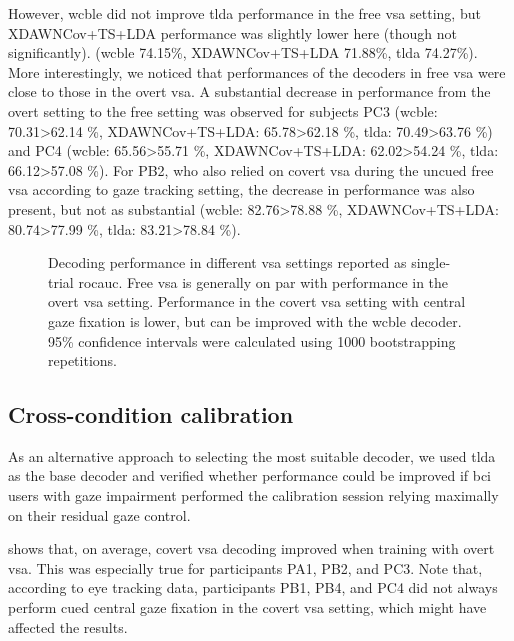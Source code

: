 However, \ac{wcble} did not improve \ac{tlda} performance in the free \ac{vsa} setting, but
XDAWNCov+TS+LDA performance was slightly lower here (though not
significantly).
(\ac{wcble} 74.15\%, XDAWNCov+TS+LDA 71.88\%, \ac{tlda} 74.27\%).
More interestingly, we noticed that performances of the decoders in free
\ac{vsa} were close to those in the overt \ac{vsa}.
A substantial decrease in performance from the overt setting to the free
setting was observed for subjects PC3
(\ac{wcble}: 70.31>62.14 \%, XDAWNCov+TS+LDA: 65.78>62.18 \%, \ac{tlda}:
70.49>63.76 \%)
and PC4
(\ac{wcble}: 65.56>55.71 \%, XDAWNCov+TS+LDA: 62.02>54.24 \%, \ac{tlda}:
66.12>57.08 \%).
For PB2, who also relied on covert \ac{vsa} during the uncued free \ac{vsa}
according to gaze tracking setting, the decrease in performance was also
present, but not as substantial
(\ac{wcble}: 82.76>78.88 \%, XDAWNCov+TS+LDA: 80.74>77.99 \%, \ac{tlda}:
83.21>78.84 \%).

\begin{figure}
  
  \caption[%
    Decoding performance in different \acs{vsa} settings.
  ]{%
    Decoding performance in different \ac{vsa} settings reported as
    single-trial \ac{rocauc}.
    Free \ac{vsa} is generally on par with performance in the overt \ac{vsa}
    setting.
    Performance in the covert \ac{vsa} setting with central gaze fixation is lower, but can
    be improved with the \ac{wcble} decoder.
    95\% confidence intervals were calculated using 1000 bootstrapping
    repetitions.
  }
  \label{fig:patients/decode}
\end{figure}

\subsection{Cross-condition calibration}
\label{sec:patients/outcomes/cross}

As an alternative approach to selecting the most suitable decoder, we used
\ac{tlda} as the base decoder and verified whether performance could be improved
if \ac{bci} users with gaze impairment performed the calibration session relying
maximally on their residual gaze control.

 shows that, on average, covert \ac{vsa} decoding
improved when training with overt \ac{vsa}.
This was especially true for participants PA1, PB2, and PC3.
Note that, according to eye tracking data, participants PB1, PB4, and PC4 did not
always perform cued central gaze fixation in the covert \ac{vsa} setting,
which might have affected the results.

